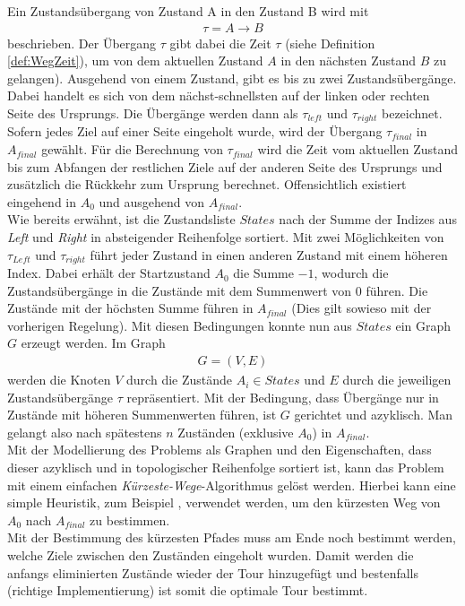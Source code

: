 \documentclass[german,version-2019-11]{uzl-thesis}
\begin{document}
Ein Zustandsübergang von Zustand A in den Zustand B wird mit
\begin{align*}
\tau = A\rightarrow B
\end{align*}
beschrieben. Der Übergang $\tau$ gibt dabei die Zeit $\tau$ (siehe Definition \ref{def:WegZeit}), um von dem aktuellen Zustand $A$ in den nächsten Zustand $B$ zu gelangen). Ausgehend von einem Zustand, gibt es bis zu zwei Zustandsübergänge. Dabei handelt es sich von dem nächst-schnellsten auf der linken oder rechten Seite des Ursprungs. Die Übergänge werden dann als $\tau_{left}$ und $\tau_{right}$ bezeichnet. Sofern jedes Ziel auf einer Seite eingeholt wurde, wird der Übergang $\tau_{final}$ in $A_{final}$ gewählt. Für die Berechnung von $\tau_{final}$ wird die Zeit vom aktuellen Zustand bis zum Abfangen der restlichen Ziele auf der anderen Seite des Ursprungs und zusätzlich die Rückkehr zum Ursprung berechnet. Offensichtlich existiert eingehend in $A_0$ und ausgehend von $A_{final}$. \\
Wie bereits erwähnt, ist die Zustandsliste $States$ nach der Summe der Indizes aus \emph{Left} und \emph{Right} in absteigender Reihenfolge sortiert. Mit zwei Möglichkeiten von $\tau_{Left}$ und $\tau_{right}$ führt jeder Zustand in einen anderen Zustand mit einem höheren Index. Dabei erhält der Startzustand $A_0$ die Summe $-1$, wodurch die Zustandsübergänge in die Zustände mit dem Summenwert von $0$ führen. Die Zustände mit der höchsten Summe führen in $A_{final}$ (Dies gilt sowieso mit der vorherigen Regelung). Mit diesen Bedingungen konnte nun aus $States$ ein Graph $G$ erzeugt werden. Im Graph
\begin{align*}
G = (V,E)
\end{align*}
werden die Knoten $V$ durch die Zustände $A_i \in States$ und $E$ durch die jeweiligen Zustandsübergänge $\tau$ repräsentiert. Mit der Bedingung, dass Übergänge nur in Zustände mit höheren Summenwerten führen, ist $G$ gerichtet und azyklisch. Man gelangt also nach spätestens $n$ Zuständen (exklusive $A_0$) in $A_{final}$. \\
Mit der Modellierung des Problems als Graphen und den Eigenschaften, dass dieser azyklisch und in topologischer Reihenfolge sortiert ist, kann das Problem mit einem einfachen \emph{Kürzeste-Wege}-Algorithmus gelöst werden. Hierbei kann eine simple Heuristik, zum Beispiel \cite{brandstadt1994kurzeste}, verwendet werden, um den kürzesten Weg von $A_0$ nach $A_{final}$ zu bestimmen.\\
Mit der Bestimmung des kürzesten Pfades muss am Ende noch bestimmt werden, welche Ziele zwischen den Zuständen eingeholt wurden. Damit werden die anfangs eliminierten Zustände wieder der Tour hinzugefügt und bestenfalls (richtige Implementierung) ist somit die optimale Tour bestimmt. 
\end{document}
